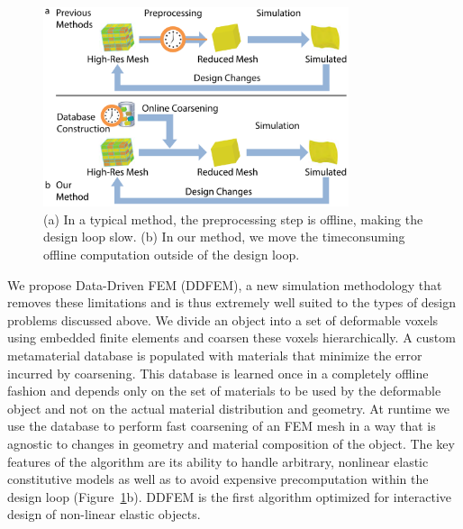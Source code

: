 \begin{figure}
	\centering
	\includegraphics[width=0.8\textwidth]{figs/typical1.pdf}
	\caption{(a) In a typical method, the preprocessing step is offline,
		making the design loop slow. (b) In our method, we move the timeconsuming
		offline computation outside of the design loop.}
	\label{fig:typical}
\end{figure}

We propose Data-Driven FEM (DDFEM), a new simulation methodology
that removes these limitations and is thus extremely well suited
to the types of design problems discussed above.
We divide an object into a set of deformable voxels using embedded finite
elements and coarsen these voxels hierarchically.
A custom metamaterial database is populated with materials that minimize the error incurred by coarsening.
This database is learned once in a completely offline fashion and depends only on the set of materials to be used by the deformable object and not on the actual material distribution
and geometry.
At runtime we use the database to perform fast coarsening of an FEM mesh in a way that is agnostic to changes in geometry and material composition of the object.
The key features of the algorithm are its ability to handle arbitrary, nonlinear elastic
constitutive models as well as to avoid expensive precomputation
within the design loop (Figure~\ref{fig:typical}b).
DDFEM is the first algorithm optimized for interactive design of non-linear elastic objects.
